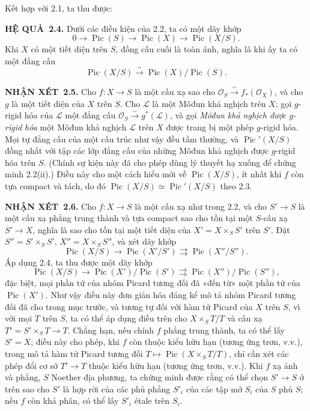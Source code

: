 \documentclass[11pt,twoside,openany]{book}
\numberwithin{equation}{section}
\newcommand{\src}[1]{%
  \phantomsection\hypertarget{src:\fgasourceid:#1}{}%
  \marginpar{\raggedleft\footnotesize\sffamily #1}%
}
\newcommand{\fgasourceid}{unset}
\newcommand{\result}[2]{\par\medskip\noindent\textbf{#1\if\relax\detokenize{#2}\relax\else\ #2\fi.}\quad}
\begin{document}
Kết hợp với 2.1, ta thu được:

\result{HỆ QUẢ}{2.4} Dưới các điều kiện của 2.2, ta có một dãy khớp
\[
0\longrightarrow\operatorname{Pic}(S)\longrightarrow\operatorname{Pic}(X)
\longrightarrow\operatorname{Pic}(X/S).
\]
Khi $X$ có một tiết diện trên $S$, đồng cấu cuối là toàn ánh, nghĩa là khi ấy
ta có một đẳng cấu
\[
\operatorname{Pic}(X/S)\xrightarrow{\sim}
\operatorname{Pic}(X)/\operatorname{Pic}(S).
\]

\result{NHẬN XÉT}{2.5} Cho $f:X\longrightarrow S$ là một cấu xạ sao cho
$\mathcal O_S\xrightarrow{\sim}f_*(\mathcal O_X)$, và cho $g$ là một tiết
diện của $X$ trên $S$. Cho $\mathcal L$ là một Môđun khả nghịch trên $X$; gọi
$g$-rigid hóa của $\mathcal L$ một đẳng cấu
$\mathcal O_S\xrightarrow{\sim}g^*(\mathcal L)$, và gọi
\emph{Môđun khả nghịch được $g$-rigid hóa} một Môđun khả nghịch $\mathcal L$
trên $X$ được trang bị một phép $g$-rigid hóa. Mọi tự đẳng cấu của một cấu
trúc như vậy đều tầm thường, và
$\operatorname{Pic}'(X/S)$ đồng nhất với tập các lớp đẳng cấu của những Môđun
khả nghịch được $g$-rigid hóa trên $S$. (Chính sự kiện này đã cho phép dùng lý thuyết hạ
xuống để chứng minh 2.2(ii).) Điều này cho một cách hiểu mới về
$\operatorname{Pic}(X/S)$, ít nhất khi $f$ còn tựa compact và tách, do đó
$\operatorname{Pic}(X/S)\simeq\operatorname{Pic}'(X/S)$ theo 2.3.
\src{148}
\result{NHẬN XÉT}{2.6} Cho $f:X\longrightarrow S$ là một cấu xạ như trong
2.2, và cho $S'\longrightarrow S$ là một cấu xạ phẳng trung thành và tựa
compact sao cho tồn tại một $S$-cấu xạ $S'\longrightarrow X$, nghĩa là sao cho
tồn tại một tiết diện của $X'=X\times_SS'$ trên $S'$. Đặt
$S''=S'\times_SS'$, $X''=X\times_SS''$, và xét dãy khớp
\[
\operatorname{Pic}(X/S)\longrightarrow\operatorname{Pic}(X'/S')
\rightrightarrows\operatorname{Pic}(X''/S'').
\]
Áp dụng 2.4, ta thu được một dãy khớp
\[
\operatorname{Pic}(X/S)\longrightarrow
\operatorname{Pic}(X')/\operatorname{Pic}(S')
\rightrightarrows
\operatorname{Pic}(X'')/\operatorname{Pic}(S''),
\]
đặc biệt, mọi phần tử của nhóm Picard tương đối đã «đến từ» một phần tử của
$\operatorname{Pic}(X')$. Như vậy điều này đơn giản hóa đáng kể mô tả nhóm
Picard tương đối đã cho trong mục trước, và tương tự đối với hàm tử Picard của
$X$ trên $S$, vì với mọi $T$ trên $S$, ta có thể áp dụng điều trên cho
$X\times_ST/T$ và cấu xạ $T'=S'\times_ST\longrightarrow T$. Chẳng hạn, nếu
chính $f$ phẳng trung thành, ta có thể lấy $S'=X$; điều này cho phép, khi $f$
còn thuộc kiểu hữu hạn (tương ứng trơn, v.v.), trong mô tả hàm tử Picard tương
đối $T\longmapsto\operatorname{Pic}(X\times_ST/T)$, chỉ cần xét các phép đổi
cơ sở $T'\longrightarrow T$ thuộc kiểu hữu hạn (tương ứng trơn, v.v.). Khi
$f$ xạ ảnh và phẳng, $S$ Noether địa phương, ta chứng minh được rằng có thể
chọn $S'\longrightarrow S$ ở trên sao cho $S'$ là hợp rời của các phủ phẳng
$S'_i$ của các tập mở $S_i$ của $S$ phủ $S$; nếu $f$ còn khả phân, có thể lấy $S'_i$
étale trên $S_i$.
\end{document}
